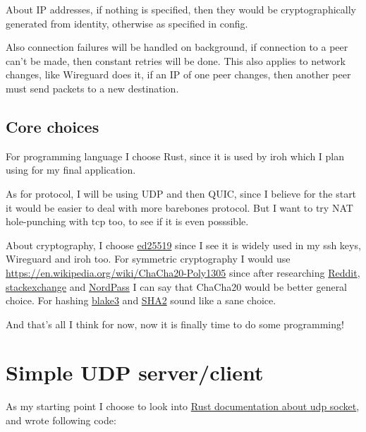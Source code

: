 \documentclass[a4paper]{article}
\begin{document}
About IP addresses, if nothing is specified, then they would be cryptographically generated
from identity, otherwise as specified in config.

Also connection failures will be handled on background, if connection to a peer can't be made,
then constant retries will be done. This also applies to network changes, like Wireguard does it,
if an IP of one peer changes, then another peer must send packets to a new destination.

\subsection{Core choices}
For programming language I choose Rust, since it is used by iroh which I plan using
for my final application.

As for protocol, I will be using UDP and then QUIC, since I believe for the start it would
be easier to deal with more barebones protocol. But I want to try NAT hole-punching with tcp too,
to see if it is even posssible.

About cryptography, I choose \href{https://en.wikipedia.org/wiki/EdDSA#Ed25519}{ed25519}
since I see it is widely used in my ssh keys, Wireguard and iroh too. For symmetric cryptography
I would use \href{ChaCha20}{https://en.wikipedia.org/wiki/ChaCha20-Poly1305} since after researching
\href{https://www.reddit.com/r/crypto/comments/f7c2nv/chacha20_v_aes256/}{Reddit},
\href{https://crypto.stackexchange.com/questions/101050/xchacha20-vs-aes-128-security-and-speed}{stackexchange}
and \href{https://nordpass.com/features/xchacha20-encryption/}{NordPass}
I can say that ChaCha20 would be better general choice.
For hashing \href{https://en.wikipedia.org/wiki/BLAKE_(hash_function)}{blake3}
and \href{https://en.wikipedia.org/wiki/SHA-2}{SHA2} sound like a sane choice.

And that's all I think for now, now it is finally time to do some programming!


\newpage
\section{Simple UDP server/client}

As my starting point I choose to look into \href{https://doc.rust-lang.org/std/net/struct.UdpSocket.html}{Rust documentation about udp socket},
and wrote following code:
\end{document}
